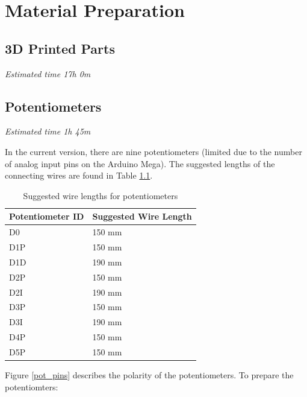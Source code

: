 
\chapter{Material Preparation}  %

\label {Material Preparation} 
%
%

\section{3D Printed Parts}
\textit{Estimated time 17h 0m}

\section{Potentiometers}
\textit{Estimated time 1h 45m}

In the current version, there are nine potentiometers (limited due to the number of analog input pins on the Arduino Mega). The suggested lengths of the connecting wires are found in Table \ref{potentiometer_table}.

\begin{table}[H]
\centering
\caption{Suggested wire lengths for potentiometers}
\label{potentiometer_table}
\begin{tabular}{| l | l |}
\hline
\textbf{Potentiometer ID} & \textbf{Suggested Wire Length}  \\ \hline
D0 & 150 mm \\ \hline
D1P & 150 mm \\ \hline
D1D & 190 mm \\ \hline
D2P & 150 mm \\ \hline
D2I & 190 mm \\ \hline
D3P & 150 mm \\ \hline
D3I & 190 mm \\ \hline
D4P & 150 mm \\ \hline
D5P & 150 mm \\ \hline
\end{tabular}
\end{table} 

Figure \ref{pot_pins} describes the polarity of the potentiometers. To prepare the potentiomters:

